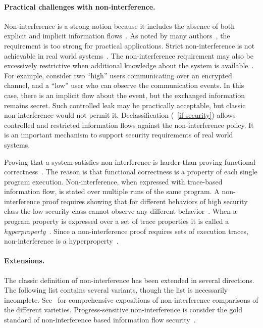\paragraph*{Practical challenges with non-interference.}
Non-interference is a strong notion because it includes the absence of both 
explicit and implicit information flows~\cite{bossi2005}.
As noted by many authors~\cite{cecchetti2017,bossi2005}, the requirement is too strong for practical applications.
Strict non-interference is not achievable in real world systems~\cite{bossi2005}.
The non-interference requirement may also be excessively restrictive when additional knowledge about the system is available~\cite{bossi2005}.
For example, consider two \enquote{high} users communicating over an encrypted channel,
 and a \enquote{low} user who can observe the communication events.
In this case, there is an implicit flow about the event, but the exchanged information remains secret.
Such controlled leak may be practically acceptable, but classic non-interference would not permit it.
Declassification (\cf~\autoref{if-security}) allows controlled and restricted 
information flows against the non-interference policy.
It is an important mechanism to support security requirements of real world systems.

Proving that a system satisfies non-interference is harder than proving functional correctness~\cite{frumin2021}.
The reason is that functional correctness is a property of each single program execution.
Non-interference, when expressed with trace-based information flow, is stated over multiple runs of the same program.
A non-interference proof requires showing that for different behaviors of high security class the low security class cannot observe any different behavior~\cite{frumin2021}.
When a program property is expressed over a set of trace properties it is called a {\emph{hyperproperty}}~\cite{clarkson2010}.
Since a non-interference proof requires sets of execution traces, 
{non-interference} is a {hyperproperty}~\cite{mastroeni2019}.

\paragraph*{Extensions.}
The classic definition of {non-interference} has been extended in several directions.
The following list contains several variants, though the list is necessarily incomplete.
See~\cite{vandermeyden2010,nelson2020,eggert2014} for comprehensive expositions of {non-interference} comparisons of the different varieties.
{Progress-sensitive non-interference} is consider the gold standard of non-interference based information flow security~\cite{derakhshan2024}.


